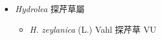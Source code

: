 
  \begin{itemize}
 \item[] \textit{Hydrolea} 探芹草屬
                                
  \begin{itemize}
        \item[] \textit{H. zeylanica} (L.) Vahl  探芹草   VU
  \end{itemize}
  \end{itemize}
